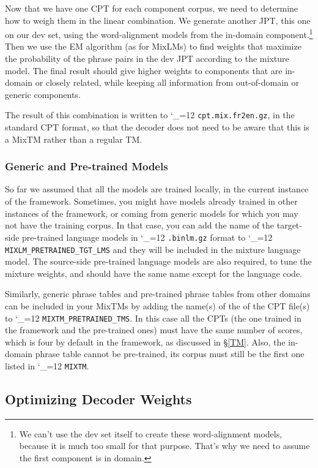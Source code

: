 \documentclass[11pt,letterpaper]{article}
\def\code{\begingroup\catcode`\_=12 \codex}
\newcommand{\codex}[1]{\texttt{#1}\endgroup}
\begin{document}
Now that we have one CPT for each component corpus, we need to determine how to
weigh them in the linear combination.  We generate another JPT, this one on our
dev set, using the word-alignment models from the in-domain
component.\footnote{We can't use the dev set itself to create these
word-alignment models, because it is much too small for that purpose.  That's
why we need to assume the first component is in domain.}  Then we use the EM
algorithm (as for MixLMs) to find weights that maximize the probability of the
phrase pairs in the dev JPT according to the mixture model.  The final result
should give higher weights to components that are in-domain or closely related,
while keeping all information from out-of-domain or generic components.

The result of this combination is written to \code{cpt.mix.fr2en.gz}, in
the standard CPT format, so that the decoder does not need to be aware that
this is a MixTM rather than a regular TM.

\subsubsection{Generic and Pre-trained Models} \label{Generic}

So far we assumed that all the models are trained locally, in the current
instance of the framework.  Sometimes, you might have models already trained in
other instances of the framework, or coming from generic models for which you
may not have the training corpus.  In that case, you can add the name of the
target-side pre-trained language models in \code{.binlm.gz} format to
\code{MIXLM_PRETRAINED_TGT_LMS} and they will be included in the mixture
language model.  The source-side pre-trained language models are also required,
to tune the mixture weights, and should have the same name except for the
language code.

Similarly, generic phrase tables and pre-trained phrase tables from other
domains can be included in your MixTMs by adding the name(s) of the of the CPT
file(s) to \code{MIXTM_PRETRAINED_TMS}.  In this case all the CPTs (the one
trained in the framework and the pre-trained ones) must have the same number of
scores, which is four by default in the framework, as discussed in \S\ref{TM}.
Also, the in-domain phrase table cannot be pre-trained, its corpus must still
be the first one listed in \code{MIXTM}.

\subsection{Optimizing Decoder Weights} \label{COW}
\end{document}
